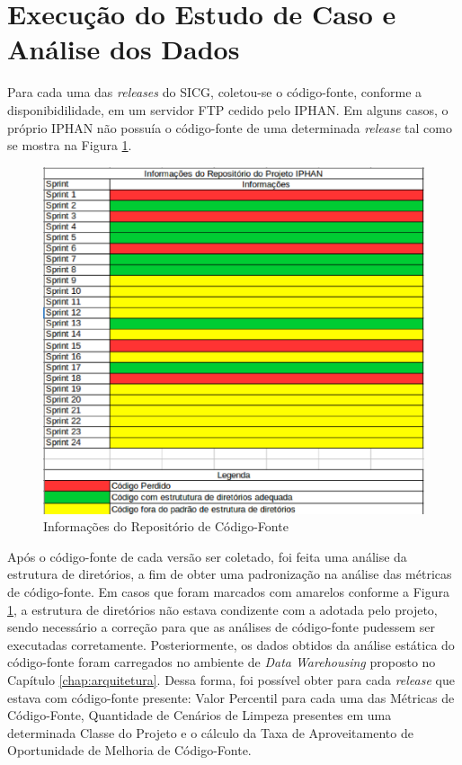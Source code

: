 \section{Execução do Estudo de Caso e Análise dos Dados}
\label{sec:execution-case-study}

Para cada uma das \textit{releases} do SICG, coletou-se o código-fonte, conforme a disponibidilidade, em um servidor FTP cedido pelo IPHAN. Em alguns casos, o próprio IPHAN não possuía o código-fonte de uma determinada \textit{release} tal como se mostra na Figura \ref{fig:repositorio-IPHAN}.

\begin{figure}[ht!]
\centering
\includegraphics[keepaspectratio=true,scale=0.5]{figuras/repositorio-iphan.eps}
\caption{Informações do Repositório de Código-Fonte}
\label{fig:repositorio-IPHAN}
\end{figure}
\FloatBarrier


Após o código-fonte de cada versão ser coletado, foi feita uma análise da estrutura de diretórios, a fim de obter uma padronização na análise das métricas de código-fonte. Em casos que foram marcados com amarelos conforme a Figura \ref{fig:repositorio-IPHAN}, a estrutura de diretórios não estava condizente com a adotada pelo projeto, sendo necessário a correção para que as análises de código-fonte pudessem ser executadas corretamente. Posteriormente, os dados obtidos da análise estática do código-fonte foram carregados no ambiente de \textit{Data Warehousing} proposto no Capítulo \ref{chap:arquitetura}. Dessa forma, foi possível obter para cada \textit{release} que estava com código-fonte presente: Valor Percentil para cada uma das Métricas de Código-Fonte, Quantidade de Cenários de Limpeza presentes em uma determinada Classe do Projeto e o cálculo da Taxa de Aproveitamento de Oportunidade de Melhoria de Código-Fonte. 



